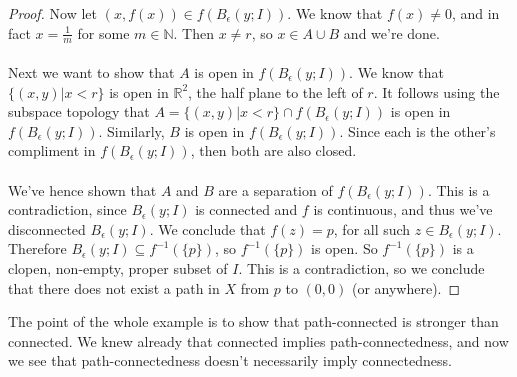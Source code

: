 \documentclass{article}
\newcommand{\R}{\mathbb{R}}
\newcommand{\N}{\mathbb{N}}
\theoremstyle{definition}
\begin{document}
\begin{proof}
Now let $(x, f(x)) \in f\left( B_{\epsilon} (y;I) \right)$. We know that $f(x) \neq 0$, and in fact $x = \frac{1}{m}$ for some $m\in \N$. Then $x\neq r$, so $x\in A\cup B$ and we're done. \\ \\
Next we want to show that $A$ is open in $f(B_{\epsilon} (y;I))$. We know that $\{(x,y) | x<r \}$ is open in $\R^2$, the half plane to the left of $r$. It follows using the subspace topology that $A = \{ (x,y) | x< r \} \cap f\left( B_{\epsilon} (y;I) \right)$ is open in $f\left( B_{\epsilon} (y;I ) \right)$. Similarly, $B$ is open in $f\left( B_{\epsilon} (y;I ) \right)$. Since each is the other's compliment in $f\left( B_{\epsilon} (y;I ) \right)$, then both are also closed. \\ \\
We've hence shown that $A$ and $B$ are a separation of $f\left( B_{\epsilon} (y;I ) \right)$. This is a contradiction, since $B_{\epsilon} (y;I)$ is connected and $f$ is continuous, and thus we've disconnected $B_{\epsilon}(y;I)$. We conclude that $f(z) = p$, for all such $z\in B_{\epsilon}(y;I)$. Therefore $B_{\epsilon} (y;I) \subseteq f^{-1}(\{ p\})$, so $f^{-1} (\{p\})$ is open. So $f^{-1}( \{ p \} )$ is a clopen, non-empty, proper subset of $I$. This is a contradiction, so we conclude that there does not exist a path in $X$ from $p$ to $(0,0)$ (or anywhere).
\end{proof}

The point of the whole example is to show that path-connected is stronger than connected. We knew already that connected implies path-connectedness, and now we see that  path-connectedness doesn't necessarily imply connectedness.
\end{document}
